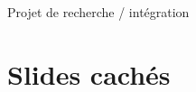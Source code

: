\documentclass[11pt, aspectratio=149]{beamer}
\newcommand{\Hc}{\mathcal{H}}
\begin{document}

\begin{frame}{Projet de recherche / intégration}
	
    \begin{figure}
	\centering
	\def\svgwidth{0.95\textwidth}
	\footnotesize
	
\end{figure}
\end{frame}


\appendix

\section{Slides cachés}
\end{document}
